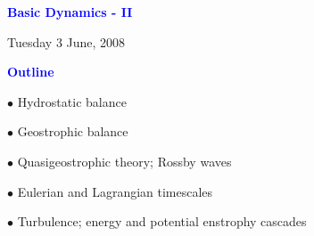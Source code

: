 \documentclass[a4]{seminar}
\newcommand{\B}[1]{\textcolor{blue}{#1}}
\begin{document}

\pagestyle{fancy}



\begin{slide}

\begin{center}

{\Large \bf
\B{Basic Dynamics - II}
}

\end{center}

\vspace{6mm}

\begin{center}
{\small Tuesday 3 June, 2008}
\end{center}

\end{slide}


\begin{slide}


\B{\bf Outline}

\vspace{4mm}

\(\bullet\) Hydrostatic balance

\(\bullet\) Geostrophic balance

\(\bullet\) Quasigeostrophic theory; Rossby waves

\vspace{4mm}

\(\bullet\) Eulerian and Lagrangian timescales

\vspace{4mm}

\(\bullet\) Turbulence; energy and potential enstrophy cascades


\end{slide}

\end{document}
